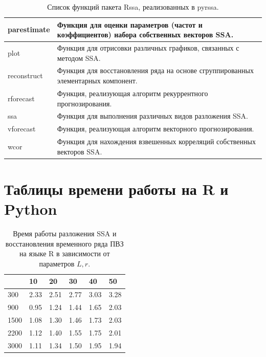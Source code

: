 \documentclass[specialist,
			   substylefile = spbu_report.rtx,
			   subf,href,colorlinks=true, 12pt]{disser}
\begin{document}
\begin{table}[htp]
	\centering
	\begin{tabularx}{\textwidth}{| l | X |}
		
		\hline
		parestimate & Функция для оценки параметров (частот и коэффициентов) набора собственных векторов SSA. \\
		\hline
		plot & Функция для отрисовки различных графиков, связанных с методом SSA.\\
		\hline
		reconstruct & Функция для восстановления ряда на основе сгруппированных элементарных компонент.\\
		\hline
		rforecast & Функция, реализующая алгоритм рекуррентного прогнозирования.\\
		\hline
		ssa & Функция для выполнения различных видов разложения SSA.\\
		\hline
		vforecast & Функция, реализующая алгоритм векторного прогнозирования.\\
		\hline
		wcor & Функция для нахождения взвешенных корреляций собственных векторов SSA.\\
		\hline
		 
	\end{tabularx}
	\caption{\label{tab:pyrssa-functions} Список функций пакета Rssa, реализованных в pyrssa.}
\end{table}


\chapter{Таблицы времени работы на R и Python}

\begin{table}[htp]
	\centering
	\begin{tabular}{ | l | l | l | l | l | l |}
		
		\hline
		\backslashbox{$L$}{$r$} & 10 & 20 & 30 & 40 & 50 \\ 
		\hline
		300 & 2.33 & 2.51 & 2.77 & 3.03 & 3.28  \\
		\hline
		900 & 0.95 & 1.24 & 1.44 & 1.65 & 2.03 \\
		\hline
		1500 & 1.08 & 1.30 & 1.46 & 1.73 & 2.03 \\
		\hline
		2200 & 1.12 & 1.40 & 1.55 & 1.75 & 2.01 \\
		\hline
		3000 & 1.11 & 1.34 & 1.50 & 1.95 & 1.94 \\
		\hline
	\end{tabular}
	\caption{\label{tab:r-time-table} Время работы разложения SSA и восстановления временного ряда ПВЗ на языке R в зависимости от параметров $L, r$.}
\end{table}
\end{document}

